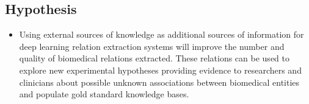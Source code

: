 \subsection*{Hypothesis}

\begin{itemize}
    \item Using external sources of knowledge as additional sources of information for deep learning relation extraction systems will improve the number and quality of biomedical relations extracted. These relations can be used to explore new experimental hypotheses providing evidence to researchers and clinicians about possible unknown associations between biomedical entities and populate gold standard knowledge bases.
\end{itemize}






